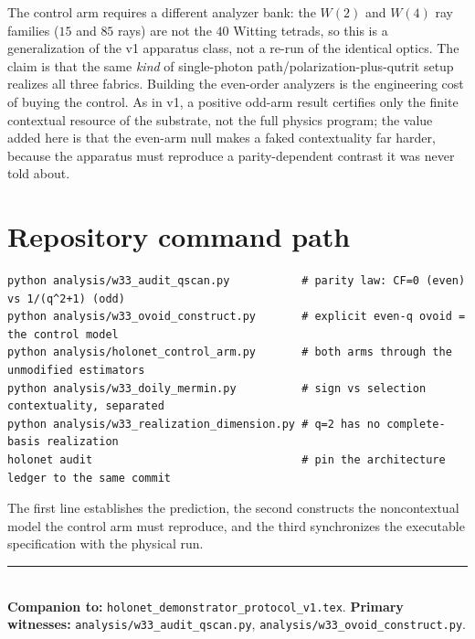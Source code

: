 \documentclass[11pt]{article}
\begin{document}
\begin{honestbox}
The control arm requires a different analyzer bank: the $W(2)$ and $W(4)$ ray families ($15$ and $85$
rays) are not the $40$ Witting tetrads, so this is a generalization of the v1 apparatus class, not a
re-run of the identical optics.  The claim is that the same \emph{kind} of single-photon
path/polarization-plus-qutrit setup realizes all three fabrics.  Building the even-order analyzers is
the engineering cost of buying the control.  As in v1, a positive odd-arm result certifies only the
finite contextual resource of the substrate, not the full physics program; the value added here is that
the even-arm null makes a faked contextuality far harder, because the apparatus must reproduce a
parity-dependent contrast it was never told about.
\end{honestbox}

\section{Repository command path}
\begin{verbatim}
python analysis/w33_audit_qscan.py           # parity law: CF=0 (even) vs 1/(q^2+1) (odd)
python analysis/w33_ovoid_construct.py       # explicit even-q ovoid = the control model
python analysis/holonet_control_arm.py       # both arms through the unmodified estimators
python analysis/w33_doily_mermin.py          # sign vs selection contextuality, separated
python analysis/w33_realization_dimension.py # q=2 has no complete-basis realization
holonet audit                                # pin the architecture ledger to the same commit
\end{verbatim}
The first line establishes the prediction, the second constructs the noncontextual model the control arm
must reproduce, and the third synchronizes the executable specification with the physical run.

\bigskip
\noindent\rule{\linewidth}{0.4pt}\\[0.25em]
{\footnotesize \textbf{Companion to:} \texttt{holonet\_demonstrator\_protocol\_v1.tex}.\quad
\textbf{Primary witnesses:} \texttt{analysis/w33\_audit\_qscan.py},
\texttt{analysis/w33\_ovoid\_construct.py}.}
\end{document}
